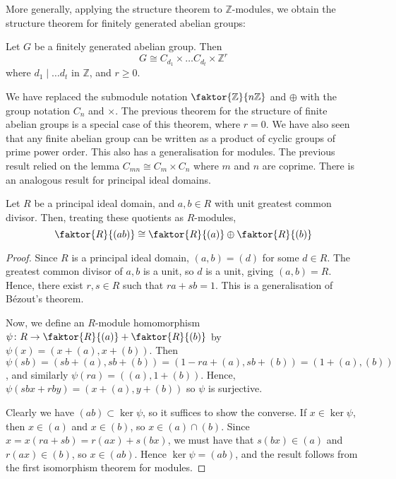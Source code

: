 More generally, applying the structure theorem to \( \mathbb Z \)-modules, we obtain the structure theorem for finitely generated abelian groups:
\begin{theorem}
	Let \( G \) be a finitely generated abelian group.
	Then
	\[ G \cong C_{d_1} \times \dots C_{d_t} \times \mathbb Z^r \]
	where \( d_1 \mid \dots d_t \) in \( \mathbb Z \), and \( r \geq 0 \).
\end{theorem}
We have replaced the submodule notation \( \faktor{\mathbb Z}{n\mathbb Z} \) and \( \oplus \) with the group notation \( C_n \) and \( \times \).
The previous theorem for the structure of finite abelian groups is a special case of this theorem, where \( r = 0 \).
We have also seen that any finite abelian group can be written as a product of cyclic groups of prime power order.
This also has a generalisation for modules.
The previous result relied on the lemma \( C_{mn} \cong C_m \times C_n \) where \( m \) and \( n \) are coprime.
There is an analogous result for principal ideal domains.
\begin{lemma}
	Let \( R \) be a principal ideal domain, and \( a, b \in R \) with unit greatest common divisor.
	Then, treating these quotients as \( R \)-modules,
	\[ \faktor{R}{(ab)} \cong \faktor{R}{(a)} \oplus \faktor{R}{(b)} \]
\end{lemma}
\begin{proof}
	Since \( R \) is a principal ideal domain, \( (a,b) = (d) \) for some \( d \in R \).
	The greatest common divisor of \( a, b \) is a unit, so \( d \) is a unit, giving \( (a,b) = R \).
	Hence, there exist \( r,s \in R \) such that \( ra + sb = 1 \).
	This is a generalisation of B\'ezout's theorem.

	Now, we define an \( R \)-module homomorphism \( \psi \colon R \to \faktor{R}{(a)} + \faktor{R}{(b)} \) by \( \psi(x) = (x+(a), x+(b)) \).
	Then \( \psi(sb) = (sb+(a), sb+(b)) = (1-ra+(a),sb+(b)) = (1+(a), (b)) \), and similarly \( \psi(ra) = ((a),1+(b)) \).
	Hence, \( \psi(sbx + rby) = (x+(a),y+(b)) \) so \( \psi \) is surjective.

	Clearly we have \( (ab) \subset \ker \psi \), so it suffices to show the converse.
	If \( x \in \ker \psi \), then \( x \in (a) \) and \( x \in (b) \), so \( x \in (a) \cap (b) \).
	Since \( x = x(ra+sb) = r(ax) + s(bx) \), we must have that \( s(bx) \in (a) \) and \( r(ax) \in (b) \), so \( x \in (ab) \).
	Hence \( \ker \psi = (ab) \), and the result follows from the first isomorphism theorem for modules.
\end{proof}
